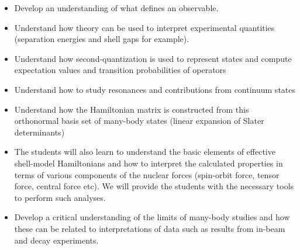\documentclass{beamer}
\begin{document}
\begin{frame}
\begin{block}{}
\begin{itemize}
\item Develop an understanding of what defines an observable. 

\item Understand how theory  can be used to interpret experimental quantities (separation energies and shell gaps for example).

\item Understand how second-quantization is used to represent states and compute expectation values and transition probabilities  of operators

\item Understand how to study resonances and contributions from continuum states

\item Understand how the Hamiltonian matrix is constructed from this orthonormal basis set of many-body states (linear expansion of Slater determinants)

\item The students will also learn to understand the basic elements of effective shell-model Hamiltonians and how to interpret the calculated properties in terms of various components of the nuclear forces (spin-orbit force, tensor force, central force etc). We will provide the students with the necessary tools to perform such analyses. 

\item Develop a critical understanding of the limits of many-body studies and how these can be related to interpretations of data such as results from in-beam and decay experiments.
\end{itemize}

\noindent
\end{block}
\end{frame}
\end{document}
